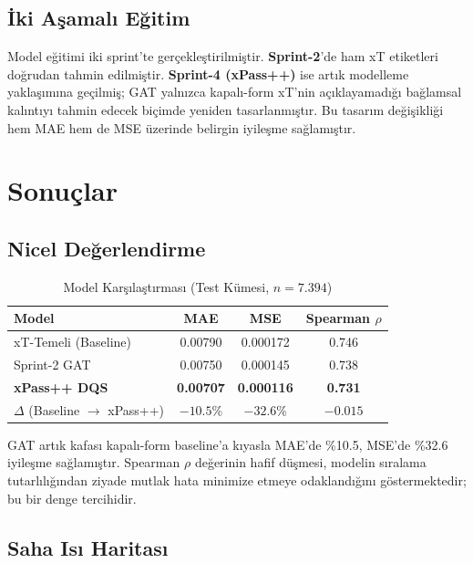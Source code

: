 \documentclass[conference]{IEEEtran}
\begin{document}
\subsection{İki Aşamalı Eğitim}

Model eğitimi iki sprint'te gerçekleştirilmiştir. \textbf{Sprint-2}'de ham xT
etiketleri doğrudan tahmin edilmiştir. \textbf{Sprint-4 (xPass++)} ise artık
modelleme yaklaşımına geçilmiş; GAT yalnızca kapalı-form xT'nin açıklayamadığı
bağlamsal kalıntıyı tahmin edecek biçimde yeniden tasarlanmıştır. Bu tasarım
değişikliği hem MAE hem de MSE üzerinde belirgin iyileşme sağlamıştır.

\section{Sonuçlar}

\subsection{Nicel Değerlendirme}

\begin{table}[H]
  \centering
  \caption{Model Karşılaştırması (Test Kümesi, $n = 7.394$)}
  \label{tab:results}
  \begin{tabular}{lccc}
    \toprule
    \textbf{Model} & \textbf{MAE} & \textbf{MSE} & \textbf{Spearman $\rho$} \\
    \midrule
    xT-Temeli (Baseline) & 0.00790 & 0.000172 & 0.746 \\
    Sprint-2 GAT         & 0.00750 & 0.000145 & 0.738 \\
    \textbf{xPass++ DQS} & \textbf{0.00707} & \textbf{0.000116} & \textbf{0.731} \\
    \midrule
    $\Delta$ (Baseline $\to$ xPass++) & $-10.5\%$ & $-32.6\%$ & $-0.015$ \\
    \bottomrule
  \end{tabular}
\end{table}

GAT artık kafası kapalı-form baseline'a kıyasla MAE'de \%10.5, MSE'de \%32.6
iyileşme sağlamıştır. Spearman $\rho$ değerinin hafif düşmesi, modelin sıralama
tutarlılığından ziyade mutlak hata minimize etmeye odaklandığını göstermektedir;
bu bir denge tercihidir.

\subsection{Saha Isı Haritası}
\end{document}
